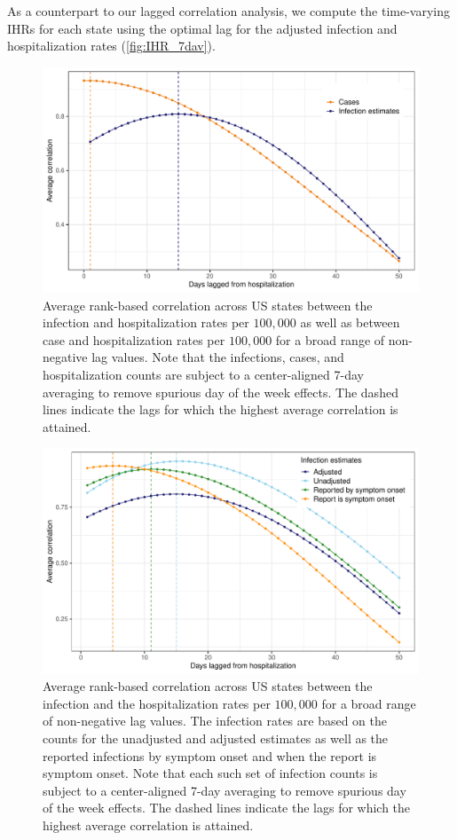 \documentclass{article}
\begin{document}
As a counterpart to our lagged correlation analysis, we compute the time-varying IHRs 
for each state using the optimal lag for the adjusted infection and hospitalization rates 
(\autoref{fig:IHR_7dav}). 

\begin{figure}[!tb]
\centering
    \includegraphics[width=.9\textwidth]{infect_case_hosp_lag_corr.pdf} 
    \caption{Average rank-based correlation across US states between the infection and 
    hospitalization rates per $100,000$ as well as between case and 
    hospitalization rates per $100,000$ for a broad range of non-negative
     lag values. Note that the infections, cases, and hospitalization counts are subject 
     to a center-aligned 7-day averaging to remove spurious day of the week effects. 
     The dashed lines indicate the lags for which the highest average correlation is attained.}
    \label{fig:infect_case_hosp_lag_corr}
\end{figure}

\begin{figure}[!tb]
\centering
    \includegraphics[width=.9\textwidth]{adj_unadj_sym_inc_hosp_lag_corr.pdf} 
    \caption{Average rank-based correlation across US states between the infection 
    and the hospitalization rates per $100,000$ for a broad range of non-negative lag values. 
    The infection rates are based on the counts for the unadjusted and adjusted estimates as 
    well as the reported infections by symptom onset and when the report is symptom onset. 
    Note that each such set of infection counts 
    is subject to a center-aligned 7-day averaging to remove spurious day of the week effects. 
     The dashed lines indicate the lags for which the highest average correlation is attained.}
    \label{fig:adj_unadj_sym_hosp_lag_corr}
\end{figure}
\end{document}
